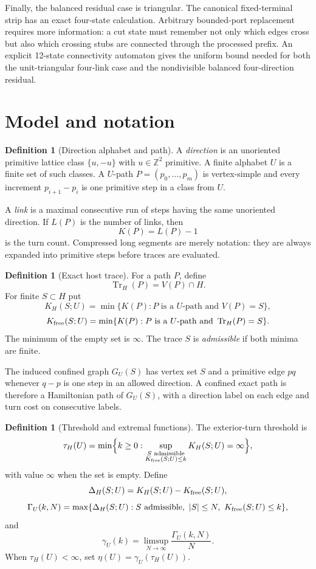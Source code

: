 \documentclass[11pt]{article}
\theoremstyle{definition}
\newtheorem{definition}[theorem]{Definition}
\newcommand{\Z}{\mathbb Z}
\newcommand{\Tr}{\operatorname{Tr}}
\begin{document}
Finally, the balanced residual case is triangular.  The canonical fixed-terminal strip has an exact four-state calculation.  Arbitrary bounded-port replacement requires more information: a cut state must remember not only which edges cross but also which crossing stubs are connected through the processed prefix.  An explicit 12-state connectivity automaton gives the uniform bound needed for both the unit-triangular four-link case and the nondivisible balanced four-direction residual.

\section{Model and notation}\label{sec:model}
\begin{definition}[Direction alphabet and path]
A \emph{direction} is an unoriented primitive lattice class $\{u,-u\}$ with $u\in\Z^2$ primitive.  A finite alphabet $U$ is a finite set of such classes.  A $U$-path $P=(p_0,\ldots,p_m)$ is vertex-simple and every increment $p_{i+1}-p_i$ is one primitive step in a class from $U$.
\end{definition}

A \emph{link} is a maximal consecutive run of steps having the same unoriented direction.  If $L(P)$ is the number of links, then
\[
K(P)=L(P)-1
\]
is the turn count.  Compressed long segments are merely notation: they are always expanded into primitive steps before traces are evaluated.

\begin{definition}[Exact host trace]
For a path $P$, define
\[
\Tr_H(P)=V(P)\cap H.
\]
For finite $S\subset H$ put
\[
K_H(S;U)=\min\{K(P):P\text{ is a $U$-path and }V(P)=S\},
\]
\[
K_{\rm free}(S;U)=\min\{K(P):P\text{ is a $U$-path and }\Tr_H(P)=S\}.
\]
The minimum of the empty set is $\infty$.  The trace $S$ is \emph{admissible} if both minima are finite.
\end{definition}

The induced confined graph $G_U(S)$ has vertex set $S$ and a primitive edge $pq$ whenever $q-p$ is one step in an allowed direction.  A confined exact path is therefore a Hamiltonian path of $G_U(S)$, with a direction label on each edge and turn cost on consecutive labels.

\begin{definition}[Threshold and extremal functions]
The exterior-turn threshold is
\[
\tau_H(U)=\min\Bigl\{k\ge0:\sup_{\substack{S\text{ admissible}\\K_{\rm free}(S;U)\le k}}K_H(S;U)=\infty\Bigr\},
\]
with value $\infty$ when the set is empty.  Define
\[
\Delta_H(S;U)=K_H(S;U)-K_{\rm free}(S;U),
\]
\[
\Gamma_U(k,N)=\max\{\Delta_H(S;U):S\text{ admissible},\ |S|\le N,\ K_{\rm free}(S;U)\le k\},
\]
and
\[
\gamma_U(k)=\limsup_{N\to\infty}\frac{\Gamma_U(k,N)}{N}.
\]
When $\tau_H(U)<\infty$, set $\eta(U)=\gamma_U(\tau_H(U))$.
\end{definition}
\end{document}
